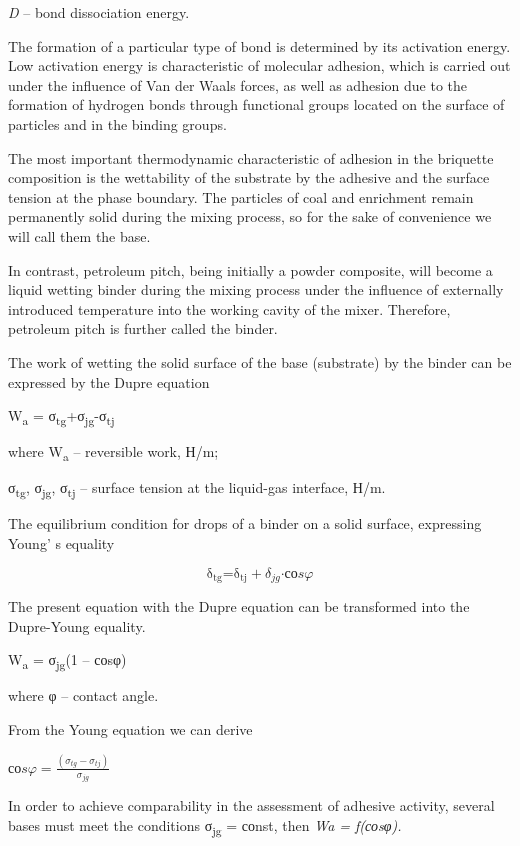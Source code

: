 \emph{D} -- bond dissociation energy.

The formation of a particular type of bond is determined by its
activation energy. Low activation energy is characteristic of molecular
adhesion, which is carried out under the influence of Van der Waals
forces, as well as adhesion due to the formation of hydrogen bonds
through functional groups located on the surface of particles and in the
binding groups.

The most important thermodynamic characteristic of adhesion in the
briquette composition is the wettability of the substrate by the
adhesive and the surface tension at the phase boundary. The particles of
coal and enrichment remain permanently solid during the mixing process,
so for the sake of convenience we will call them the base.

In contrast, petroleum pitch, being initially a powder composite, will
become a liquid wetting binder during the mixing process under the
influence of externally introduced temperature into the working cavity
of the mixer. Therefore, petroleum pitch is further called the binder.

The work of wetting the solid surface of the base (substrate) by the
binder can be expressed by the Dupre equation

W\textsubscript{a} =
σ\textsubscript{tg}+σ\textsubscript{jg}-σ\textsubscript{tj}

where W\textsubscript{a} -- reversible work, Н/m;

σ\textsubscript{tg}, σ\textsubscript{jg}, σ\textsubscript{tj} -- surface
tension at the liquid-gas interface, Н/m.

The equilibrium condition for drops of a binder on a solid surface,
expressing Young' s equality

\[\text{δ}_{\text{tg}}{\text{=}\text{δ}}_{\text{tj}} + \delta_{jg}·соs\varphi\]

The present equation with the Dupre equation can be transformed into the
Dupre-Young equality.

W\textsubscript{a} = σ\textsubscript{jg}(1 -- соsφ)

where φ -- contact angle.

From the Young equation we can derive

\(соs\varphi = \frac{(\sigma_{tg} - \sigma_{tj})}{\sigma_{jg}}\)

In order to achieve comparability in the assessment of adhesive
activity, several bases must meet the conditions σ\textsubscript{jg} =
соnst, then \emph{Wa = f(соsφ).}

